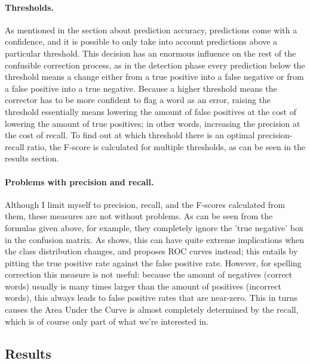 \documentclass[12pt]{article}
\begin{document}

\paragraph{Thresholds.} As mentioned in the section about prediction accuracy, predictions come with a confidence, and it is possible to only take into account predictions above a particular threshold. This decision has an enormous influence on the rest of the confusible correction process, as in the detection phase every prediction below the threshold means a change either from a true positive into a false negative or from a false positive into a true negative. Because a higher threshold means the corrector has to be more confident to flag a word as an error, raising the threshold essentially means lowering the amount of false positives at the cost of lowering the amount of true positives; in other words, increasing the precision at the cost of recall. To find out at which threshold there is an optimal precision-recall ratio, the F-score is calculated for multiple thresholds, as can be seen in the results section.

\paragraph{Problems with precision and recall.} Although I limit myself to precision, recall, and the F-scores calculated from them, these measures are not without problems. As can be seen from the formulas given above, for example, they completely ignore the 'true negative' box in the confusion matrix. As \citet{fawcett04} shows, this can have quite extreme implications when the class distribution changes, and proposes ROC curves instead; this entails by pitting the true positive rate against the false positive rate. However, for spelling correction this measure is not useful: because the amount of negatives (correct words) usually is many times larger than the amount of positives (incorrect words), this always leads to false positive rates that are near-zero. This in turns causes the Area Under the Curve is almost completely determined by the recall, which is of course only part of what we're interested in.

\subsection{Results}
\end{document}
